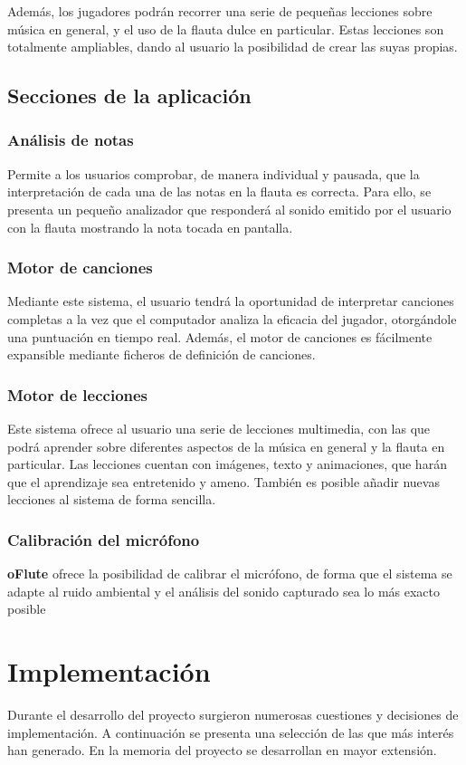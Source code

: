\documentclass[a4paper,11pt]{article}
\begin{document}
Además, los jugadores podrán recorrer una serie de pequeñas lecciones sobre
música en general, y el uso de la flauta dulce en particular. Estas lecciones
son totalmente ampliables, dando al usuario la posibilidad de crear las suyas
propias.

\subsection{Secciones de la aplicación}

\subsubsection{Análisis de notas}
Permite a los usuarios comprobar, de manera individual y pausada, que la
interpretación de cada una de las notas en la flauta es correcta. Para ello, se
presenta un pequeño analizador que responderá al sonido emitido por el usuario
con la flauta mostrando la nota tocada en pantalla.

\subsubsection{Motor de canciones}
Mediante este sistema, el usuario tendrá la oportunidad de interpretar canciones
completas a la vez que el computador analiza la eficacia del jugador,
otorgándole una puntuación en tiempo real. Además, el motor de canciones es
fácilmente expansible mediante ficheros de definición de canciones.

\subsubsection{Motor de lecciones}
Este sistema ofrece al usuario una serie de lecciones multimedia, con las que
podrá aprender sobre diferentes aspectos de la música en general y la flauta en
particular. Las lecciones cuentan con imágenes, texto y animaciones, que harán
que el aprendizaje sea entretenido y ameno. También es posible añadir nuevas
lecciones al sistema de forma sencilla.

\subsubsection{Calibración del micrófono}
\textbf{oFlute} ofrece la posibilidad de calibrar el micrófono, de forma que el
sistema se adapte al ruido ambiental y el análisis del sonido capturado sea lo
más exacto posible

\section{Implementación}
Durante el desarrollo del proyecto surgieron numerosas cuestiones y decisiones
de implementación. A continuación se presenta una selección de las que más
interés han generado. En la memoria del proyecto se desarrollan en mayor
extensión.
\end{document}
